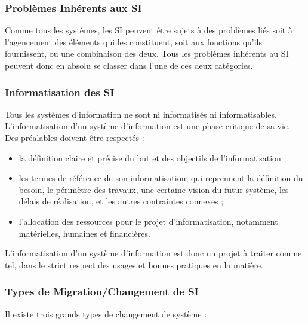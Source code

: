 \subsubsection{Problèmes Inhérents aux SI}

Comme tous les systèmes, les SI peuvent être sujets à des problèmes liés soit à
l'agencement des éléments qui les constituent, soit aux fonctions qu'ils fournissent,
ou une combinaison des deux. Tous les problèmes inhérents au SI peuvent donc en
absolu se classer dans l'une de ces deux catégories.

\subsubsection{Informatisation des SI}

Tous les systèmes d'information ne sont ni informatisés ni informatisables.
L'informatisation d'un système d'information est une phase critique de sa vie. Des
préalables doivent être respectés :
\begin{itemize}
  \item la définition claire et précise du but et des objectifs de l'informatisation ;
  \item les termes de référence de son informatisation, qui reprennent la définition du
    besoin, le périmètre des travaux, une certaine vision du futur système, les délais
    de réalisation, et les autres contraintes connexes ;
  \item l'allocation des ressources pour le projet d'informatisation, notamment
    matérielles, humaines et financières.
\end{itemize}

L'informatisation d'un système d'information est donc un projet à traiter comme tel,
dans le strict respect des usages et bonnes pratiques en la matière.

\subsubsection{Types de Migration/Changement de SI}

Il existe trois grands types de changement de système :

